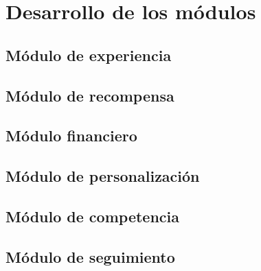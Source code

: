 
\chapter{Desarrollo de los módulos}\label{mod:concentrado}

    \section{Módulo de experiencia}\label{mod:exp}
    

    \section{Módulo de recompensa}\label{mod:recomp}

    \section{Módulo financiero}\label{mod:financ}

    \section{Módulo de personalización}\label{mod:pers}

    \section{Módulo de competencia}\label{mod:comp}
    

    \section{Módulo de seguimiento}\label{mod:seguim}

